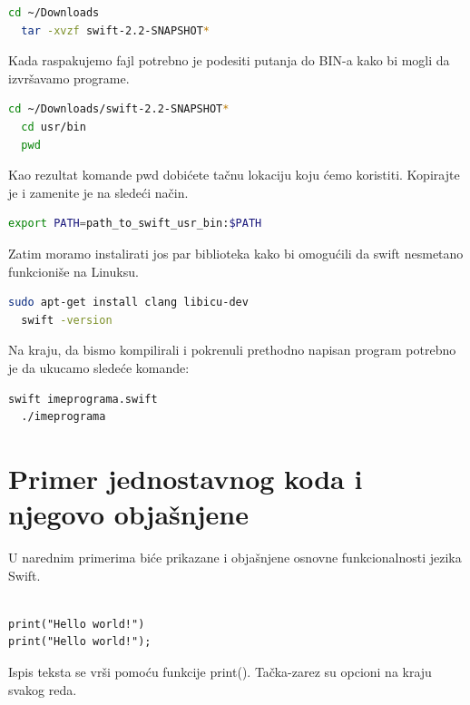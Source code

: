 \documentclass[a4paper]{article}
\begin{document}
\begin{lstlisting}[language=bash]
  cd ~/Downloads
  tar -xvzf swift-2.2-SNAPSHOT*
\end{lstlisting}

Kada raspakujemo fajl potrebno je podesiti putanja do BIN-a kako bi mogli da izvršavamo programe.

\begin{lstlisting}[language=bash]
  cd ~/Downloads/swift-2.2-SNAPSHOT*
  cd usr/bin
  pwd
\end{lstlisting}

Kao rezultat komande pwd dobićete tačnu lokaciju koju ćemo koristiti. Kopirajte je i zamenite je na sledeći način.
\begin{lstlisting}[language=bash]
  export PATH=path_to_swift_usr_bin:$PATH

\end{lstlisting}

Zatim moramo instalirati jos par biblioteka kako bi omogućili da swift nesmetano funkcioniše na Linuksu.

\begin{lstlisting}[language=bash]
  sudo apt-get install clang libicu-dev
  swift -version
\end{lstlisting}

Na kraju, da bismo kompilirali i pokrenuli prethodno napisan program potrebno je da ukucamo sledeće komande:

\begin{lstlisting}[language=bash]
  swift imeprograma.swift
  ./imeprograma
\end{lstlisting}



\section{Primer jednostavnog koda i njegovo objašnjene}	
\label{sec:sestiDeo}

U narednim primerima biće prikazane i objašnjene osnovne funkcionalnosti jezika Swift.

\begin{lstlisting}[caption={},frame=single, label=simple]

print("Hello world!")
print("Hello world!");

\end{lstlisting}

Ispis teksta se vrši pomoću funkcije print(). Tačka-zarez su opcioni na kraju svakog reda.\\
\end{document}
